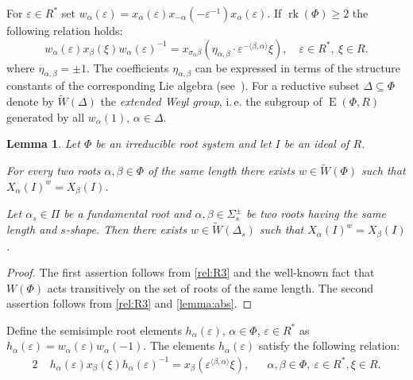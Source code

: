 \documentclass[11pt]{amsart}
\theoremstyle{plain}
\numberwithin{equation}{section}
\newtheorem{lemma}{Lemma}
\numberwithin{lemma}{section}
\theoremstyle{definition}
\theoremstyle{remark}
\DeclareMathOperator{\E}{E}
\DeclareMathOperator{\rk}{rk}
\begin{document}
For $\varepsilon\in R^*$ set $w_\alpha(\varepsilon) = x_\alpha(\varepsilon) x_{-\alpha}(-\varepsilon^{-1}) x_{\alpha}(\varepsilon).$
If $\rk(\Phi)\geqslant 2$ the following relation holds:
\begin{equation}\label{rel:R3}
w_\alpha(\varepsilon) x_{\beta}(\xi) w_\alpha(\varepsilon)^{-1} =
x_{\sigma_{\alpha}\beta} \left(\eta_{\alpha, \beta}\cdot\varepsilon^{-\langle\beta, \alpha \rangle}\xi\right), \quad \varepsilon\in R^*, \ \xi\in R.
\end{equation}
where $\eta_{\alpha, \beta}=\pm 1$. The coefficients $\eta_{\alpha, \beta}$ can be expressed in terms of the structure constants of the corresponding Lie algebra (see~\cite[\S13]{VP}).
For a reductive subset $\Delta \subseteq \Phi$ denote by $\widetilde{W}(\Delta)$ the \emph{extended Weyl group}, i.\,e. the subgroup of $\E(\Phi, R)$ generated by all $w_{\alpha}(1)$, $\alpha \in \Delta$.
\begin{lemma} \label{lemma:weylfacts} Let $\Phi$ be an irreducible root system and let $I$ be an ideal of $R$. 
\begin{lemlist}
\item \label{item-trans1} For every two roots $\alpha, \beta \in \Phi$ of the same length there exists $w \in \widetilde{W}(\Phi)$ such that $X_{\alpha}(I)^w = X_\beta(I)$.
\item \label{item-trans2} Let $\alpha_s\in \Pi$ be a fundamental root and $\alpha, \beta \in \Sigma^\pm_s$ be two roots having the same length and $s$-shape.
 Then there exists $w\in \widetilde{W}(\Delta_s)$ such that $X_\alpha(I)^w = X_\beta(I)$. \end{lemlist}
\end{lemma}
\begin{proof}
The first assertion follows from \eqref{rel:R3} and the well-known fact that $W(\Phi)$ acts transitively on the set of roots of the same length.
The second assertion follows from \eqref{rel:R3} and \cref{lemma:abs}.
\end{proof}

Define the semisimple root elements $h_\alpha(\varepsilon)$, $\alpha\in\Phi$, $\varepsilon\in R^*$ as $h_\alpha(\varepsilon)=w_\alpha(\varepsilon)w_\alpha(-1)$.
The elements $h_\alpha(\varepsilon)$ satisfy the following relation:
\begin{alignat}{2} 
& \phantom{[} h_\alpha(\varepsilon)x_\beta(\xi)h_\alpha(\varepsilon)^{-1} = x_\beta\left(\varepsilon^{\langle\beta, \alpha\rangle}\xi\right), && \alpha, \beta \in \Phi, \ \varepsilon \in R^*, \xi \in R. \label{rel:h-w}
\end{alignat}
\end{document}
